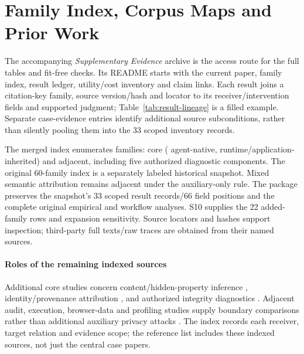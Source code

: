 \section{Family Index, Corpus Maps and Prior Work}\label{app:final-ledger}
The accompanying \emph{Supplementary Evidence} archive is the access route for the full tables and fit-free checks. Its README starts with the current paper, family index, result ledger, utility/cost inventory and claim links. Each result joins a citation-key family, source version/hash and locator to its receiver/intervention fields and supported judgment; Table~\ref{tab:result-lineage} is a filled example. Separate case-evidence entries identify additional source subconditions, rather than silently pooling them into the 33 scoped inventory records.

The merged index enumerates \FinalN{} families: \FinalCore{} core (\FinalA{} agent-native, \FinalB{} runtime/application-inherited) and \FinalAdjacent{} adjacent, including five authorized diagnostic components. The original 60-family index is a separately labeled historical snapshot. Mixed semantic attribution remains adjacent under the auxiliary-only rule. The package preserves the snapshot's 33 scoped result records/66 field positions and the complete original empirical and workflow analyses. S10 supplies the 22 added-family rows and expansion sensitivity. Source locators and hashes support inspection; third-party full texts/raw traces are obtained from their named sources.

\paragraph{Roles of the remaining indexed sources}
Additional core studies concern content/hidden-property inference \cite{abubakar2026contention,carlini2024remote,song2026personafingerprint,weiss2026detokenization,ding2025moecho,yona2024stealing}, identity/provenance attribution \cite{oderinwale2026procgrep,alhazbi2025rhythm,chaudhuri2025energon,weng2026archsnoop}, and authorized integrity diagnostics \cite{gan2026clawguard,george2025cycles,solomon2026lumimas}. Adjacent audit, execution, browser-data and profiling studies supply boundary comparisons rather than additional auxiliary privacy attacks \cite{roh2026spillage,qiao2026topr,umar2025secemb,wu2025mobileagents,mudryi2025hidden,ukani2025browserprivacy,nazari2024llmfin,anwar2026infernet}. The index records each receiver, target relation and evidence scope; the reference list includes these indexed sources, not just the central case papers.

